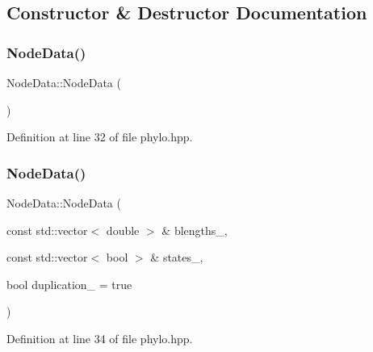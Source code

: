 \subsection{Constructor \& Destructor Documentation}
\mbox{\label{class_node_data_a56da12a9de7c80c25a905012749c8671}} 
\subsubsection{\texorpdfstring{Node\+Data()}{NodeData()}\hspace{0.1cm}{\footnotesize\ttfamily [1/2]}}
{\footnotesize\ttfamily Node\+Data\+::\+Node\+Data (\begin{DoxyParamCaption}{ }\end{DoxyParamCaption})\hspace{0.3cm}{\ttfamily [inline]}}



Definition at line 32 of file phylo.\+hpp.

\mbox{\label{class_node_data_a0a90191ba4c987afa3406f829967d8e2}} 
\subsubsection{\texorpdfstring{Node\+Data()}{NodeData()}\hspace{0.1cm}{\footnotesize\ttfamily [2/2]}}
{\footnotesize\ttfamily Node\+Data\+::\+Node\+Data (\begin{DoxyParamCaption}\item[{const std\+::vector$<$ double $>$ \&}]{blengths\+\_\+,  }\item[{const std\+::vector$<$ bool $>$ \&}]{states\+\_\+,  }\item[{bool}]{duplication\+\_\+ = {\ttfamily true} }\end{DoxyParamCaption})\hspace{0.3cm}{\ttfamily [inline]}}



Definition at line 34 of file phylo.\+hpp.

\mbox{\label{class_node_data_ad870d466c40b9be96ad79adccab79038}} 
